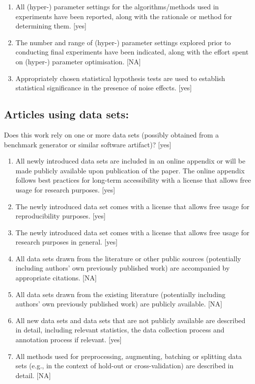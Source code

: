 \begin{enumerate}
    [yes]
    \item
    All (hyper-) parameter settings for
    the algorithms/methods used in experiments have been reported, along with the rationale or method for determining them.
    [yes]
    \item
    The number and range of (hyper-) parameter settings explored prior to conducting final experiments have been indicated, along with the effort spent on (hyper-) parameter optimisation.
    [NA]
    \item
    Appropriately chosen statistical hypothesis tests are used to establish statistical significance
    in the presence of noise effects.
    [yes]
\end{enumerate}

\subsection*{Articles using data sets:}
Does this work rely on one or more data sets (possibly obtained from a benchmark generator or similar software artifact)?
[yes]

\begin{enumerate}
    \item
    All newly introduced data sets
    are included in an online appendix
    or will be made publicly available upon publication of the paper.
    The online appendix follows best practices for long-term accessibility with a license
    that allows free usage for research purposes.
    [yes]
    \item The newly introduced data set comes with a license that
    allows free usage for reproducibility purposes.
    [yes]
    \item The newly introduced data set comes with a license that
    allows free usage for research purposes in general.
    [yes]
    \item All data sets drawn from the literature or other public sources (potentially including authors' own previously published work) are accompanied by appropriate citations.
    [NA]
    \item All data sets drawn from the existing literature (potentially including authors’ own previously published work) are publicly available. [NA]
    \item All new data sets and data sets that are not publicly available are described in detail, including relevant statistics, the data collection process and annotation process if relevant.
    [yes]
    \item
    All methods used for preprocessing, augmenting, batching or splitting data sets (e.g., in the context of hold-out or cross-validation)
    are described in detail. [NA]
\end{enumerate}

